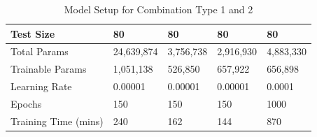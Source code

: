 \begin{table}[H]
\begin{tabularx}{\textwidth}{@{} *5{X} @{}}
Test Size            &  80         &  80            &    80          &   80           \\ \midrule
\raggedright Total Params     &   24,639,874      & 3,756,738             & 2,916,930             &  4,883,330            \\ \midrule
\raggedright Trainable Params &  1,051,138         &  526,850             & 657,922             &  656,898            \\ \midrule
Learning Rate        &  0.00001         & 0.00001             &  0.00001            &   0.0001           \\ \midrule
Epochs               &   150        &  150            &  150            & 1000             \\ \midrule
Training Time (mins)        & 240          &  162            &  144            &  870            \\
\bottomrule
\end{tabularx}
\caption{Model Setup for Combination Type 1 and 2 }
\label{table:results_5}
\end{table}



